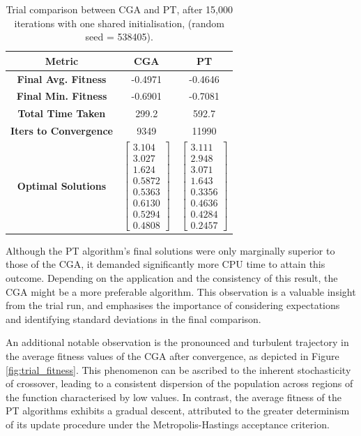 \documentclass[10pt]{article}
\begin{document}
\begin{multicols}{2}
\begin{table}[H]
    \centering
    \begin{tabular}{|c|c|c|}
    \hline
    \textbf{Metric} & \textbf{CGA} & \textbf{PT} \\
    \hline
    \textbf{Final Avg. Fitness} & -0.4971 & -0.4646 \\
    \hline
    \textbf{Final Min. Fitness} & -0.6901 & -0.7081 \\
    \hline
    \textbf{Total Time Taken} & 299.2 & 592.7 \\
    \hline
    \textbf{Iters to Convergence} & 9349 & 11990 \\
    \hline
    \textbf{Optimal Solutions} & $\begin{bmatrix} 3.104 \\ 3.027 \\ 1.624 \\ 0.5872 \\ 0.5363 \\ 0.6130 \\ 0.5294 \\ 0.4808 \end{bmatrix}$ & $\begin{bmatrix} 3.111 \\ 2.948 \\ 3.071 \\ 1.643 \\ 0.3356 \\ 0.4636 \\ 0.4284 \\ 0.2457 \end{bmatrix}$ \\
    \hline
    \end{tabular}
    \captionsetup{justification=centering}
    \caption{Trial comparison between CGA and PT, after 15,000 iterations with one shared initialisation, (random seed = 538405).}
    \label{tab:trial_comparison}
\end{table}

Although the PT algorithm's final solutions were only marginally superior to those of the CGA, it demanded significantly more CPU time to attain this outcome. Depending on the application and the consistency of this result, the CGA might be a more preferable algorithm. This observation is a valuable insight from the trial run, and emphasises the importance of considering expectations and identifying standard deviations in the final comparison.

An additional notable observation is the pronounced and turbulent trajectory in the average fitness values of the CGA after convergence, as depicted in Figure \ref{fig:trial_fitness}. This phenomenon can be ascribed to the inherent stochasticity of crossover, leading to a consistent dispersion of the population across regions of the function characterised by low values. In contrast, the average fitness of the PT algorithms exhibits a gradual descent, attributed to the greater determinism of its update procedure under the Metropolis-Hastings acceptance criterion.


\end{multicols}
\end{document}
